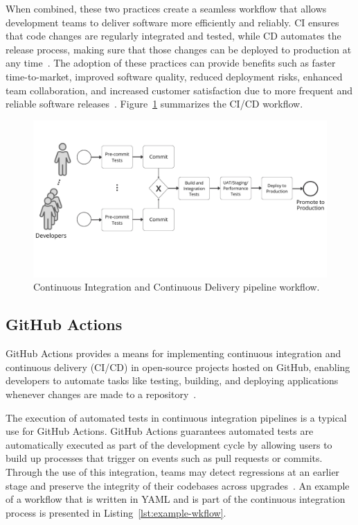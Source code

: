 \documentclass[
	msc, %
	english %
]{../ppgccufmg}
\begin{document}
    When combined, these two practices create a seamless workflow that allows development teams to deliver software more efficiently and reliably. CI ensures that code changes are regularly integrated and tested, while CD automates the release process, making sure that those changes can be deployed to production at any time~\cite{Bass2015}. The adoption of these practices can provide benefits such as faster time-to-market, improved software quality, reduced deployment risks, enhanced team collaboration, and increased customer satisfaction due to more frequent and reliable software releases~\cite{crispin2009}. Figure~\ref{fig:ci-cd-workflow} summarizes the CI/CD workflow.\\

    \begin{figure}[h]
        \centering
        \includegraphics[width=\textwidth]{img/cicd.png}
        \caption{Continuous Integration and Continuous Delivery pipeline workflow.}
        \label{fig:ci-cd-workflow}
    \end{figure}

    \subsection{GitHub Actions}\label{sec:ch2-github-actions}

        GitHub Actions provides a means for implementing continuous integration and continuous delivery (CI/CD) in open-source projects hosted on GitHub, enabling developers to automate tasks like testing, building, and deploying applications whenever changes are made to a repository~\cite{GitHub_CI}.

        The execution of automated tests in continuous integration pipelines is a typical use for GitHub Actions. GitHub Actions guarantees automated tests are automatically executed as part of the development cycle by allowing users to build up processes that trigger on events such as pull requests or commits. Through the use of this integration, teams may detect regressions at an earlier stage and preserve the integrity of their codebases across upgrades~\cite{GitHub_Actions}. An example of a workflow that is written in YAML and is part of the continuous integration process is presented in Listing~\ref{lst:example-wkflow}.
\end{document}
